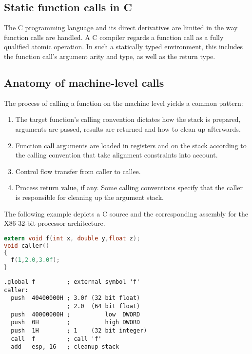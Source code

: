 \subsection{Static function calls in C}

The C programming language and its direct derivatives are limited in the way 
function calls are handled. A C compiler regards a function call as a
fully qualified atomic operation. In such a statically typed environment, this 
includes the function call's argument arity and type, as well as the
return type.\\


\subsection{Anatomy of machine-level calls}

The process of calling a function on the machine level yields a common pattern:

\begin{enumerate}
\item The target function's calling convention dictates how the stack is 
prepared, arguments are passed, results are returned and how to clean up
afterwards.
\item Function call arguments are loaded in registers and on the stack according
to the calling convention that take alignment constraints into account.
\item Control flow transfer from caller to callee.
\item Process return value, if any. Some calling conventions specify that
the caller is responsible for cleaning up the argument stack.
\end{enumerate}


\newpage

The following example depicts a C source and the corresponding assembly for the X86 32-bit processor architecture.


\begin{lstlisting}[label=cfuncall,caption=C function call,language=C]
extern void f(int x, double y,float z);
void caller()
{
  f(1,2.0,3.0f);
}
\end{lstlisting}


\begin{lstlisting}[label=x86asm,caption=Assembly X86 32-bit function call,language={[x86masm]Assembler}]
.global f         ; external symbol 'f'
caller:
  push  40400000H ; 3.0f (32 bit float)
                  ; 2.0  (64 bit float)
  push  40000000H ;          low  DWORD
  push  0H        ;          high DWORD 
  push  1H        ; 1    (32 bit integer)
  call  f         ; call 'f'
  add   esp, 16   ; cleanup stack
\end{lstlisting}



